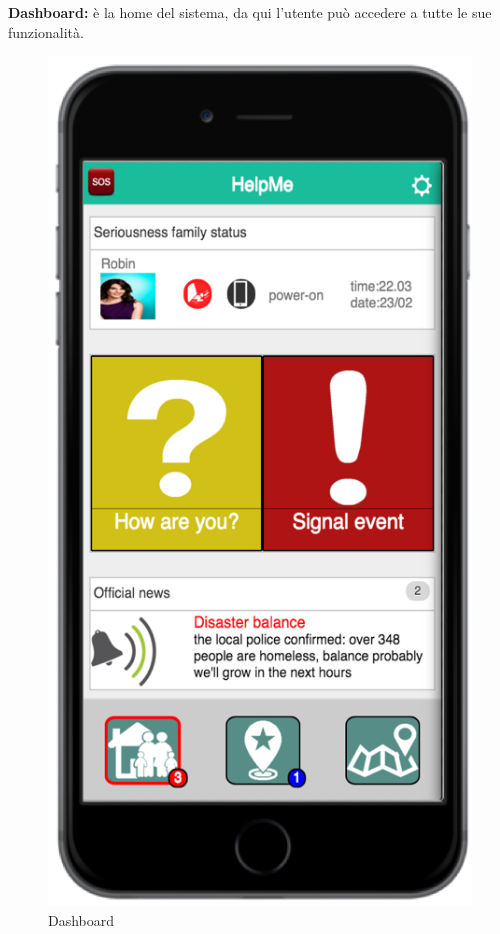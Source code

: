  \textbf{Dashboard:} è la home del sistema, da qui l'utente può accedere a tutte le sue funzionalità.
   \begin{figure}[H]
   
	\centering
	\includegraphics[scale=0.9]{interfaccia/dash.png}
	\caption{Dashboard}
	\label{fig:logo_OSM}
\end{figure}


